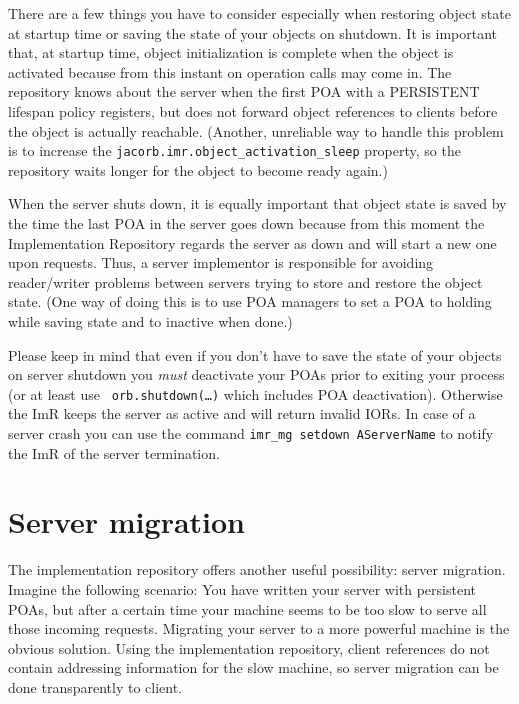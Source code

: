 \documentclass[12pt]{scrbook}
\begin{document}
There are a few things  you have to consider especially when restoring
object state  at startup time or  saving the state of  your objects on
shutdown. It is important that, at startup time, object initialization
is complete when the object  is activated because from this instant on
operation calls  may come  in. The repository  knows about  the server
when the  first POA with  a PERSISTENT lifespan policy  registers, but
does not  forward object  references to clients  before the  object is
actually reachable. (Another, unreliable way to handle this problem is
to  increase the {\tt  jacorb.imr.object\_activation\_sleep} property,
so the repository waits longer for the object to become ready again.)

When the server shuts down,  it is equally important that object state
is saved by the time the last POA in the server goes down because from
this moment  the Implementation Repository regards the  server as down
and will start a new one upon requests.  Thus, a server implementor is
responsible for avoiding reader/writer problems between servers trying
to store and  restore the object state.  (One way of  doing this is to
use POA  managers to set  a POA to  holding while saving state  and to
inactive when done.)

Please keep in mind  that even if you don't have to  save the state of
your objects  on server shutdown  you {\em must} deactivate  your POAs
prior   to   exiting   your    process   (or   at   least   use   {\tt
orb.shutdown(\dots)} which  includes POA deactivation).  Otherwise the
ImR keeps the  server as active and will return  invalid IORs. In case
of  a  server crash  you  can use  the  command  {\tt imr\_mg  setdown
AServerName} to notify the ImR of the server termination.

\section{Server migration}

The  implementation  repository  offers  another  useful  possibility:
server migration.   Imagine the  following scenario: You  have written
your  server with  persistent  POAs,  but after  a  certain time  your
machine  seems   to  be   too  slow  to   serve  all   those  incoming
requests.  Migrating your  server to  a more  powerful machine  is the
obvious  solution.    Using  the  implementation   repository,  client
references do not contain addressing information for the slow machine,
so server migration can be done transparently to client.
\end{document}
